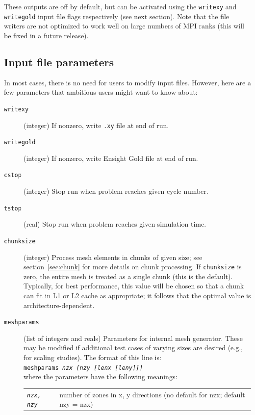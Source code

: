 \documentclass[11pt,letterpaper]{article}
\begin{document}
These outputs are off by default, but can be activated using the
{\tt writexy} and {\tt writegold} input file flags respectively
(see next section).
Note that the file writers are not optimized to work well on large
numbers of MPI ranks (this will be fixed in a future release).

\subsection{Input file parameters}

In most cases, there is no need for users to modify input files.  However,
here are a few parameters that ambitious users might want to know about:
\begin{description}
    \item[{\tt writexy}]  (integer) If nonzero, write {\tt .xy} file
        at end of run.
    \item[{\tt writegold}]  (integer) If nonzero, write Ensight Gold
        file at end of run.
    \item[{\tt cstop}]  (integer) Stop run when problem reaches given
        cycle number.
    \item[{\tt tstop}]  (real) Stop run when problem reaches given
        simulation time.
    \item[{\tt chunksize}]  (integer) Process mesh elements in chunks of
        given size; see section~\ref{sec:chunk} for more details on
        chunk processing.
        If {\tt chunksize} is zero, the entire mesh is
        treated as a single chunk (this is the default).
        Typically, for best performance, this value will be chosen so
        that a chunk can fit in L1 or L2 cache as appropriate; it
        follows that the optimal value is architecture-dependent.
    \item[{\tt meshparams}]  (list of integers and reals)
        Parameters for internal mesh generator.
        These may be modified if additional test cases of varying sizes are
        desired (e.g., for scaling studies).  The format of this line
        is: \\
        {\tt meshparams \emph{nzx [nzy [lenx [leny]]]}} \\
        where the parameters have the following meanings: \\
        \begin{tabular}{lp{320pt}}
            {\tt\emph{nzx, nzy}} &
            number of zones in x, y directions
            (no default for nzx; default nzy = nzx) \\

\end{tabular}
\end{description}
\end{document}
